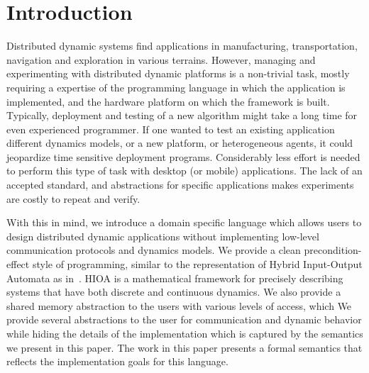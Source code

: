 \section{Introduction}
Distributed dynamic systems find applications in manufacturing, transportation, navigation and exploration in various terrains. However, managing and experimenting with distributed dynamic platforms is a
non-trivial task, mostly requiring a expertise of the programming language in which the application is implemented, and the hardware platform on which the framework is built. Typically, deployment and testing of a new algorithm might take a long time for even experienced programmer.  If one wanted to test an existing application different dynamics models, or a new platform, or heterogeneous agents, it could jeopardize time sensitive deployment programs.  Considerably less effort is needed to perform this type of task with desktop (or mobile) applications. The lack of an accepted standard, and abstractions for specific applications makes experiments are costly to repeat and verify. 

With this in mind, we introduce a domain specific language which allows users to design distributed dynamic applications without implementing low-level communication protocols and dynamics models. We provide a clean precondition-effect style of programming, similar to the representation of Hybrid Input-Output Automata as in~\cite{lynch1996hybrid}. HIOA is a mathematical framework for precisely describing
systems that have both discrete and continuous dynamics. We also provide a shared memory abstraction to the users with various levels of access, which 
We provide several abstractions to the user for communication and dynamic behavior while hiding the details of the implementation which is captured by the semantics we present in this paper. The work in this paper presents a formal semantics that reflects the implementation goals for this language. 